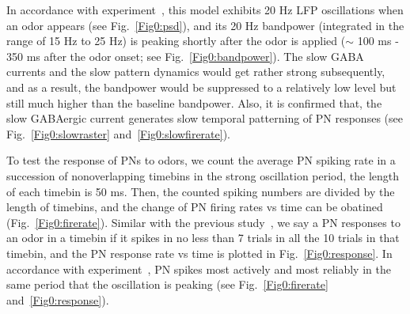 \documentclass[12pt, a4paper]{article}
\begin{document}
In accordance with experiment~\citep{}, %
this model exhibits 20 Hz LFP oscillations when an odor appears (see Fig.~\ref{Fig0:psd}), and its 20 Hz bandpower (integrated in the range of 15 Hz to 25 Hz) is peaking shortly after the odor is applied ($\sim$ 100 ms - 350 ms after the odor onset; see Fig.~\ref{Fig0:bandpower}). The slow GABA currents and the slow pattern dynamics would get rather strong subsequently, and as a result, the bandpower would be suppressed to a relatively low level but still much higher than the baseline bandpower. Also, it is confirmed that, the slow GABAergic current generates slow temporal patterning of PN responses (see Fig.~\ref{Fig0:slowraster} and~\ref{Fig0:slowfirerate}).

To test the response of PNs to odors, we count the average PN spiking rate in a succession of nonoverlapping timebins in the strong oscillation period, the length of each timebin is 50 ms. Then, the counted spiking numbers are divided by the length of timebins, and the change of PN firing rates vs time can be obatined (Fig.~\ref{Fig0:firerate}). Similar with the previous study~\citep{}, we say a PN responses to an odor in a timebin if it spikes in no less than 7 trials in all the 10 trials in that timebin, and the PN response rate vs time is plotted in Fig.~\ref{Fig0:response}. In accordance with experiment~\citep{}, PN spikes most actively and most reliably in the same period that the oscillation is peaking (see Fig.~\ref{Fig0:firerate} and~\ref{Fig0:response}).
\end{document}
